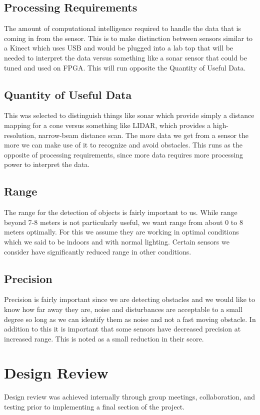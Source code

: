 \documentclass[oneside,final,a4paper]{report}
\begin{document}
\subsection{Processing Requirements}
The amount of computational intelligence required to handle the data that is coming in from the sensor. This is to make distinction between sensors similar to a Kinect which uses USB and would be plugged into a lab top that will be needed to interpret the data versus something like a sonar sensor that could be tuned and used on FPGA. This will run opposite the Quantity of Useful Data.

\subsection{Quantity of Useful Data}
This was selected to distinguish things like sonar which provide simply a distance mapping for a cone versus something like LIDAR, which provides a high-resolution, narrow-beam distance scan. The more data we get from a sensor the more we can make use of it to recognize and avoid obstacles. This runs as the opposite of processing requirements, since more data requires more processing power to interpret the data.

\subsection{Range}
The range for the detection of objects is fairly important to us. While range beyond 7-8 meters is not particularly useful, we want range from about 0 to 8 meters optimally. For this we assume they are working in optimal conditions which we said to be indoors and with normal lighting. Certain sensors we consider have significantly reduced range in other conditions.

\subsection{Precision}
Precision is fairly important since we are detecting obstacles and we would like to know how far away they are, noise and disturbances are acceptable to a small degree so long as we can identify them as noise and not a fast moving obstacle. In addition to this it is important that some sensors have decreased precision at increased range. This is noted as a small reduction in their score.

\section{Design Review}
Design review was achieved internally through group meetings, collaboration, and testing prior to implementing a final section of the project.
\end{document}

